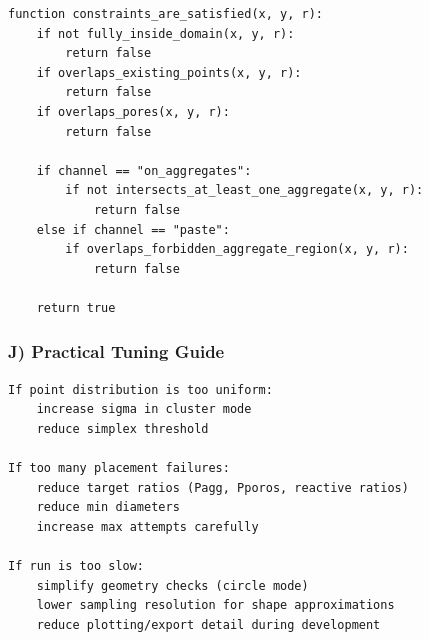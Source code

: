 ﻿\documentclass[11pt,a4paper]{article}
\begin{document}
\begin{lstlisting}[style=pseudo]
function constraints_are_satisfied(x, y, r):
	if not fully_inside_domain(x, y, r):
		return false
	if overlaps_existing_points(x, y, r):
		return false
	if overlaps_pores(x, y, r):
		return false

	if channel == "on_aggregates":
		if not intersects_at_least_one_aggregate(x, y, r):
			return false
	else if channel == "paste":
		if overlaps_forbidden_aggregate_region(x, y, r):
			return false

	return true
\end{lstlisting}


\subsubsection*{J) Practical Tuning Guide}

\begin{lstlisting}[style=pseudo]
If point distribution is too uniform:
	increase sigma in cluster mode
	reduce simplex threshold

If too many placement failures:
	reduce target ratios (Pagg, Pporos, reactive ratios)
	reduce min diameters
	increase max attempts carefully

If run is too slow:
	simplify geometry checks (circle mode)
	lower sampling resolution for shape approximations
	reduce plotting/export detail during development
\end{lstlisting}
\end{document}
